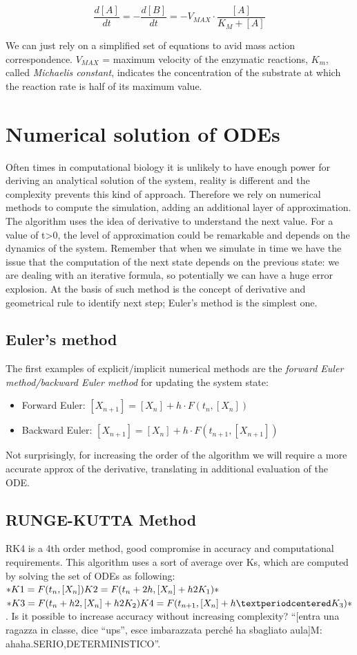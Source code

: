 $$\frac{d[A]}{dt}= - \frac{d[B]}{dt}= -V_{MAX}\cdot \frac{[A]}{K_M+[A]}$$

We can just rely on a simplified set of equations to avid mass action correspondence.
$V_{MAX}$ = maximum velocity of the enzymatic reactions, $K_m$, called \emph{Michaelis constant}, indicates the concentration of the substrate at which the reaction rate is half of its maximum value.

\section{Numerical solution of ODEs}
Often times in computational biology it is unlikely to have enough power for deriving an analytical solution of the system, reality is different and the complexity prevents this kind of approach.
Therefore we rely on numerical methods to compute the simulation, adding an additional layer of approximation.
The algorithm uses the idea of derivative to understand the next value.
For a value of t\textgreater0, the level of approximation could be remarkable and depends on the dynamics of the system.
Remember that when we simulate in time we have the issue that the computation of the next state depends on the previous state: we are dealing with an iterative formula, so potentially we can have a huge error explosion.
At the basis of such method is the concept of derivative and geometrical rule to identify next step; Euler's method is the simplest one.

  \subsection{Euler's method}
  The first examples of explicit/implicit numerical methods are the \emph{forward Euler method/backward Euler method} for updating the system state:

  \begin{itemize}
    \item Forward Euler: $[X_{n+1}] = [X_n]+h·F(t_n,[X_n])$
    \item Backward Euler: $[X_{n+1}] = [X_n]+h·F(t_{n+1},[X_{n+1}])$
  \end{itemize}

  Not surprisingly, for increasing the order of the algorithm we will require a more accurate approx of the derivative, translating in additional evaluation of the ODE.

  \subsection{RUNGE-KUTTA Method}
  RK4 is a 4th order method, good compromise in accuracy and computational requirements.
  This algorithm uses a sort of average over Ks, which are computed by solving the set of ODEs as following: $*K1 = F(t_n,[X_n])\\ K2 = F(t_n + 2h,[X_n]+ h2K_1)*$ $*K3 = F(t_n + h2,[X_n]+ h2K_2)\\ K4 = F(t_{n+1},[X_n]+h·K_3)*$.
  Is it possible to increase accuracy without increasing complexity? ``{[}entra una ragazza in classe, dice ``ups'', esce imbarazzata perché ha sbagliato aula{]}M: ahaha.SERIO,DETERMINISTICO''.

